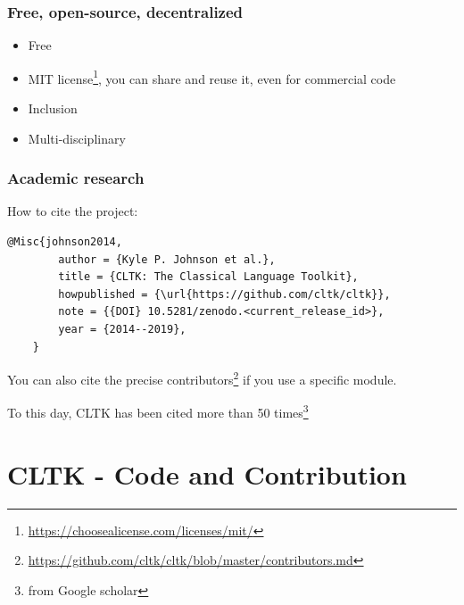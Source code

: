\documentclass{beamer}
\begin{document}
\begin{frame}
\frametitle{Free, open-source, decentralized}
\begin{itemize}
    \item Free  %
    \item MIT license\footnote{\href{https://choosealicense.com/licenses/mit/}{https://choosealicense.com/licenses/mit/}}, you can share and reuse it, even for commercial code
    \item Inclusion %
    \item Multi-disciplinary %
\end{itemize}
\end{frame}



\begin{frame}[fragile]
\frametitle{Academic research}

    How to cite the project:
    \begin{lstlisting}[basicstyle=\scriptsize,frame=single]
    @Misc{johnson2014,
        author = {Kyle P. Johnson et al.},
        title = {CLTK: The Classical Language Toolkit},
        howpublished = {\url{https://github.com/cltk/cltk}},
        note = {{DOI} 10.5281/zenodo.<current_release_id>},
        year = {2014--2019},
    }
    \end{lstlisting}
    You can also cite the precise contributors\footnote{\href{https://github.com/cltk/cltk/blob/master/contributors.md}{https://github.com/cltk/cltk/blob/master/contributors.md}} if you use a specific module.
    
    To this day, CLTK has been cited more than 50 times\footnote{from Google scholar}
\end{frame}

\section{CLTK - Code and Contribution}

\end{document}
